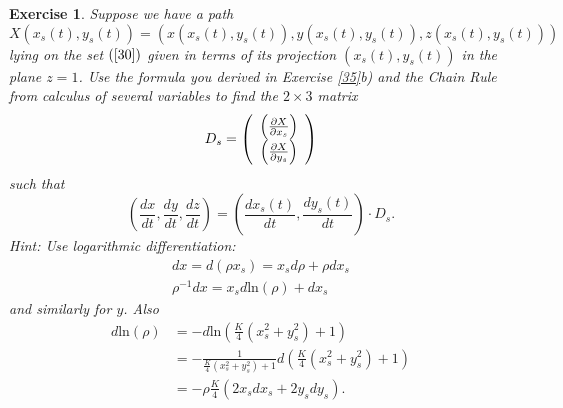\documentclass{article}%
\newtheorem{exercise}[theorem]{Exercise}
\begin{document}
\begin{exercise}
\label{37}Suppose we have a path%
\[
X\left(  x_{s}\left(  t\right)  ,y_{s}\left(  t\right)  \right)  =\left(
x\left(  x_{s}\left(  t\right)  ,y_{s}\left(  t\right)  \right)  ,y\left(
x_{s}\left(  t\right)  ,y_{s}\left(  t\right)  \right)  ,z\left(  x_{s}\left(
t\right)  ,y_{s}\left(  t\right)  \right)  \right)
\]
lying on the set $\left(  \ref{30}\right)  $ given in terms of its projection
$\left(  x_{s}\left(  t\right)  ,y_{s}\left(  t\right)  \right)  $ in the
plane $z=1$. Use the formula you derived in Exercise \ref{35}b) and the Chain
Rule from calculus of several variables to find the $2\times3$ matrix%
\[
D_{s}=\left(
\begin{array}
[c]{c}%
\left(  \frac{\partial X}{\partial x_{s}}\right) \\
\left(  \frac{\partial X}{\partial y_{s}}\right)
\end{array}
\right)
\]
such that%
\[
\left(  \frac{dx}{dt},\frac{dy}{dt},\frac{dz}{dt}\right)  =\left(
\frac{dx_{s}\left(  t\right)  }{dt},\frac{dy_{s}\left(  t\right)  }%
{dt}\right)  \cdot D_{s}.
\]
Hint: Use logarithmic differentiation:%
\begin{gather*}
dx=d\left(  \rho x_{s}\right)  =x_{s}d\rho+\rho dx_{s}\\
\rho^{-1}dx=x_{s}d\mathrm{ln}\left(  \rho\right)  +dx_{s}%
\end{gather*}
and similarly for $y$. Also%
\begin{align*}
d\mathrm{ln}\left(  \rho\right)   &  =-d\mathrm{ln}\left(  \frac{K}{4}\left(
x_{s}^{2}+y_{s}^{2}\right)  +1\right) \\
&  =-\frac{1}{\frac{K}{4}\left(  x_{s}^{2}+y_{s}^{2}\right)  +1}d\left(
\frac{K}{4}\left(  x_{s}^{2}+y_{s}^{2}\right)  +1\right) \\
&  =-\rho\frac{K}{4}\left(  2x_{s}dx_{s}+2y_{s}dy_{s}\right)  .
\end{align*}

\end{exercise}
\end{document}
